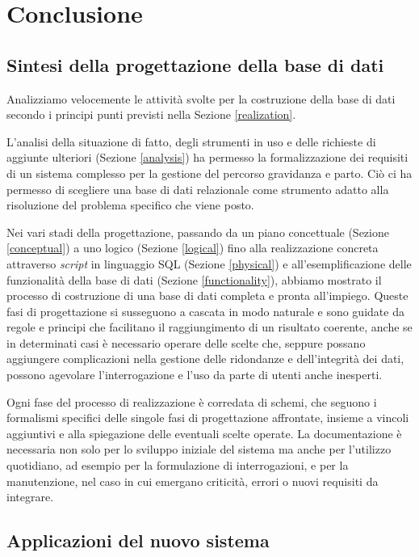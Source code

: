 \chapter{Conclusione}

\section{Sintesi della progettazione della base di dati}

Analizziamo velocemente le attività svolte per la costruzione della base di dati secondo i principi punti previsti nella Sezione \ref{realization}.

L'analisi della situazione di fatto, degli strumenti in uso e delle richieste di aggiunte ulteriori (Sezione \ref{analysis}) ha permesso la formalizzazione dei requisiti di un sistema complesso per la gestione del percorso gravidanza e parto.
Ciò ci ha permesso di scegliere una base di dati relazionale come strumento adatto alla risoluzione del problema specifico che viene posto.

Nei vari stadi della progettazione, passando da un piano concettuale (Sezione \ref{conceptual}) a uno logico (Sezione \ref{logical}) fino alla realizzazione concreta attraverso \emph{script} in linguaggio SQL (Sezione \ref{physical}) e all'esemplificazione delle funzionalità della base di dati (Sezione \ref{functionality}), abbiamo mostrato il processo di costruzione di una base di dati completa e pronta all'impiego.
Queste fasi di progettazione si susseguono a cascata in modo naturale e sono guidate da regole e principi che facilitano il raggiungimento di un risultato coerente, anche se in determinati casi è necessario operare delle scelte che, seppure possano aggiungere complicazioni nella gestione delle ridondanze e dell'integrità dei dati, possono agevolare l'interrogazione e l'uso da parte di utenti anche inesperti.

Ogni fase del processo di realizzazione è corredata di schemi, che seguono i formalismi specifici delle singole fasi di progettazione affrontate, insieme a vincoli aggiuntivi e alla spiegazione delle eventuali scelte operate.
La documentazione è necessaria non solo per lo sviluppo iniziale del sistema ma anche per l'utilizzo quotidiano, ad esempio per la formulazione di interrogazioni, e per la manutenzione, nel caso in cui emergano criticità, errori o nuovi requisiti da integrare.

\section{Applicazioni del nuovo sistema}

